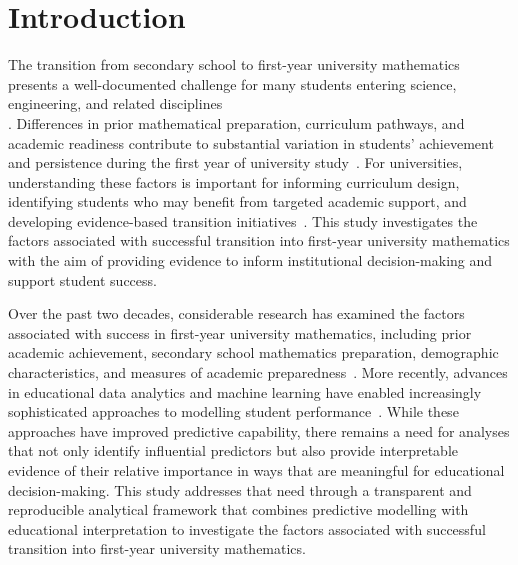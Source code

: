 %
%
%
%

\section{Introduction}

The transition from secondary school to first-year university mathematics presents a well-documented challenge for many students entering science, engineering, and related 
disciplines\\ \cite{Clark2009understanding}. Differences in prior mathematical preparation, curriculum pathways, and academic readiness contribute to substantial variation 
in students' achievement and persistence during the first year of university study~\cite{Hourigan2007underpreparedness}. For universities, understanding these factors is 
important for informing curriculum design, identifying students who may benefit from targeted academic support, and developing evidence-based transition initiatives~\cite{Thomas2008}. 
This study investigates the factors associated with successful transition into first-year university mathematics with the aim of providing evidence to inform institutional 
decision-making and support student success.

Over the past two decades, considerable research has examined the factors associated with success in first-year university mathematics, including prior academic achievement, 
secondary school mathematics preparation, demographic characteristics, and measures of academic preparedness~\cite{Clark2009understanding,England2021transition}. More recently, 
advances in educational data analytics and machine learning have enabled increasingly sophisticated approaches to modelling student performance~\cite{Koedinger2013data,Heffernan2023}. While these 
approaches have improved predictive capability, there remains a need for analyses that not only identify influential predictors but also provide interpretable evidence of their relative importance 
in ways that are meaningful for educational decision-making. This study addresses that need through a transparent and reproducible analytical framework that combines predictive modelling with 
educational interpretation to investigate the factors associated with successful transition into first-year university mathematics.

